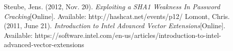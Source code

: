 \documentclass[letterpaper, 10 pt, conference]{ieeeconf}  %
\begin{document}
\addtolength{\textheight}{-12cm}   %

















\begin{thebibliography}{99}

 Steube, Jens. (2012, Nov. 20). \emph{Exploiting a SHA1 Weakness In Password Cracking}[Online]. Available: http://hashcat.net/events/p12/
 Lomont, Chris. (2011, June 21). \emph{Introduction to Intel Advanced Vector Extensions}[Online]. Available: https://software.intel.com/en-us/articles/introduction-to-intel-advanced-vector-extensions
 

\end{thebibliography}

\end{document}
